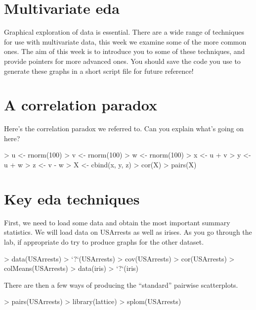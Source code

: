 

\section{Multivariate eda}

Graphical exploration of data is essential.   There are a wide range of techniques for use with multivariate data, this week we examine some of the more common ones.   The aim of this week is to introduce you to some of these techniques, and provide pointers for more advanced ones.   You should save the code you use to generate these graphs in a short script file for future reference!


\section{A correlation paradox}

Here's the correlation paradox we referred to.   Can you explain what's going on here?

\begin{Schunk}
\begin{Sinput}
> u <- rnorm(100)
> v <- rnorm(100)
> w <- rnorm(100)
> x <- u + v
> y <- u + w
> z <- v - w
> X <- cbind(x, y, z)
> cor(X)
> pairs(X)
\end{Sinput}
\end{Schunk}


\section{Key eda techniques}

First, we need to load some data and obtain the most important summary statistics.   We will load data on USArrests as well as irises.   As you go through the lab, if appropriate do try to produce graphs for the other dataset.

\begin{Schunk}
\begin{Sinput}
> data(USArrests)
> `?`(USArrests)
> cov(USArrests)
> cor(USArrests)
> colMeans(USArrests)
> data(iris)
> `?`(iris)
\end{Sinput}
\end{Schunk}

There are then a few ways of producing the ``standard'' pairwise scatterplots.

\begin{Schunk}
\begin{Sinput}
> pairs(USArrests)
> library(lattice)
> splom(USArrests)
\end{Sinput}
\end{Schunk}



